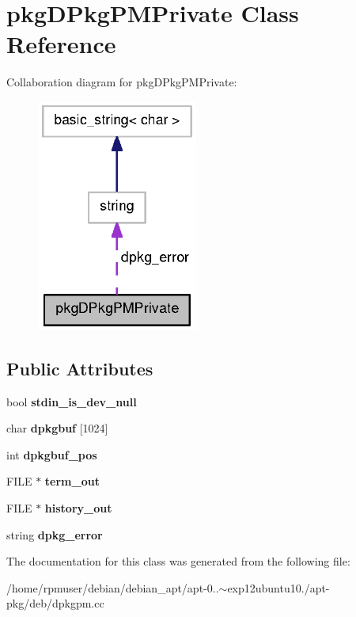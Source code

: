 \section{pkg\-D\-Pkg\-P\-M\-Private \-Class \-Reference}
\label{classpkgDPkgPMPrivate}


\-Collaboration diagram for pkg\-D\-Pkg\-P\-M\-Private\-:
\nopagebreak
\begin{figure}[H]
\begin{center}
\leavevmode
\includegraphics[width=150pt]{classpkgDPkgPMPrivate__coll__graph}
\end{center}
\end{figure}
\subsection*{\-Public \-Attributes}
\begin{DoxyCompactItemize}
\item 
bool {\bfseries stdin\-\_\-is\-\_\-dev\-\_\-null}\label{classpkgDPkgPMPrivate_a2a6abacbcc64cb0bc3477c8c3c4430ed}

\item 
char {\bfseries dpkgbuf} [1024]\label{classpkgDPkgPMPrivate_acb9fce9c4f2c3cd01c183ff339c81901}

\item 
int {\bfseries dpkgbuf\-\_\-pos}\label{classpkgDPkgPMPrivate_a115a9d2dfd41b2c7ee07b6ec0aa50f5e}

\item 
\-F\-I\-L\-E $\ast$ {\bfseries term\-\_\-out}\label{classpkgDPkgPMPrivate_a54a2ffd5b47ae1ca9d3d7644e14d1506}

\item 
\-F\-I\-L\-E $\ast$ {\bfseries history\-\_\-out}\label{classpkgDPkgPMPrivate_a9cf015611ac67c16a001414623ce5ff1}

\item 
string {\bfseries dpkg\-\_\-error}\label{classpkgDPkgPMPrivate_a2ffcf6d264f643ff4160c2092c0b8096}

\end{DoxyCompactItemize}


\-The documentation for this class was generated from the following file\-:\begin{DoxyCompactItemize}
\item 
/home/rpmuser/debian/debian\-\_\-apt/apt-\/0..$\sim$exp12ubuntu10./apt-\/pkg/deb/dpkgpm.\-cc\end{DoxyCompactItemize}
